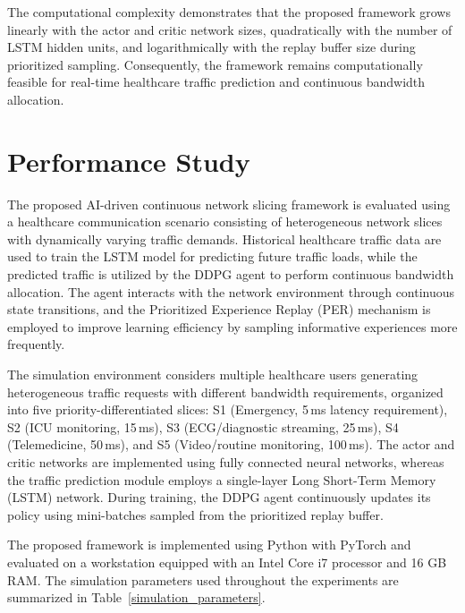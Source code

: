 \documentclass[10pt,journal,compsoc]{IEEEtran}
\begin{document}
The computational complexity demonstrates that the proposed framework grows linearly with the actor and critic network sizes, quadratically with the number of LSTM hidden units, and logarithmically with the replay buffer size during prioritized sampling. Consequently, the framework remains computationally feasible for real-time healthcare traffic prediction and continuous bandwidth allocation.

\section{Performance Study}
\label{SecPerf}

The proposed AI-driven continuous network slicing framework is evaluated using a healthcare communication scenario consisting of heterogeneous network slices with dynamically varying traffic demands. Historical healthcare traffic data are used to train the LSTM model for predicting future traffic loads, while the predicted traffic is utilized by the DDPG agent to perform continuous bandwidth allocation. The agent interacts with the network environment through continuous state transitions, and the Prioritized Experience Replay (PER) mechanism is employed to improve learning efficiency by sampling informative experiences more frequently.

The simulation environment considers multiple healthcare users generating heterogeneous traffic requests with different bandwidth requirements, organized into five priority-differentiated slices: S1 (Emergency, 5\,ms latency requirement), S2 (ICU monitoring, 15\,ms), S3 (ECG/diagnostic streaming, 25\,ms), S4 (Telemedicine, 50\,ms), and S5 (Video/routine monitoring, 100\,ms). The actor and critic networks are implemented using fully connected neural networks, whereas the traffic prediction module employs a single-layer Long Short-Term Memory (LSTM) network. During training, the DDPG agent continuously updates its policy using mini-batches sampled from the prioritized replay buffer.

The proposed framework is implemented using Python with PyTorch and evaluated on a workstation equipped with an Intel Core i7 processor and 16 GB RAM. The simulation parameters used throughout the experiments are summarized in Table~\ref{simulation_parameters}.
\end{document}

